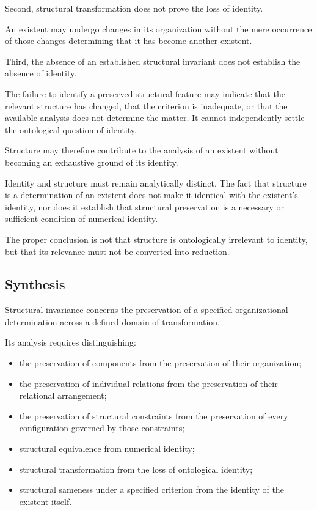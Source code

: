 Second, structural transformation
does not prove the loss of identity.

An existent may undergo changes
in its organization without the
mere occurrence of those changes
determining that it has become
another existent.

Third, the absence of an established
structural invariant does not establish
the absence of identity.

The failure to identify a preserved
structural feature may indicate
that the relevant structure has
changed, that the criterion is
inadequate, or that the available
analysis does not determine the
matter. It cannot independently
settle the ontological question
of identity.

Structure may therefore contribute
to the analysis of an existent
without becoming an exhaustive
ground of its identity.

Identity and structure must remain
analytically distinct. The fact
that structure is a determination
of an existent does not make it
identical with the existent's
identity, nor does it establish
that structural preservation is
a necessary or sufficient condition
of numerical identity.

The proper conclusion is not that
structure is ontologically irrelevant
to identity, but that its relevance
must not be converted into reduction.

\subsection{Synthesis}

Structural invariance concerns the
preservation of a specified organizational
determination across a defined domain
of transformation.

Its analysis requires distinguishing:

\begin{itemize}
    \item the preservation of components
          from the preservation of their
          organization;

    \item the preservation of individual
          relations from the preservation
          of their relational arrangement;

    \item the preservation of structural
          constraints from the preservation
          of every configuration governed
          by those constraints;

    \item structural equivalence from
          numerical identity;

    \item structural transformation from
          the loss of ontological identity;

    \item structural sameness under a
          specified criterion from the
          identity of the existent itself.
\end{itemize}

